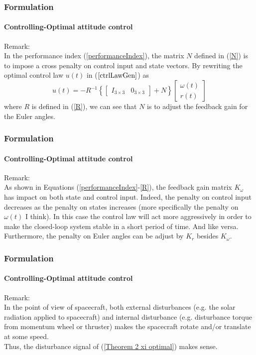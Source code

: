 \documentclass{beamer}
\begin{document}
\begin{frame}
\frametitle{Formulation}
\framesubtitle{Controlling-Optimal attitude control}
Remark:\\
In the performance index (\ref{performanceIndex}), the matrix $N$ defined in (\ref{N}) is to impose a cross penalty on control input and state vectors. 
By rewriting the optimal control law $u(t)$ in ($\ref{ctrlLawGen}$) as
\begin{equation}
u(t)=-R^{-1}\left\{\begin{bmatrix}
I_{3\times 3}&0_{3\times 3}
\end{bmatrix}+N\right\}\begin{bmatrix}
\omega(t)\\r(t)
\end{bmatrix}
\end{equation}
where $R$ is defined in (\ref{R}), we can see that $N$ is to adjust the feedback gain for the Euler angles.
\end{frame}

\begin{frame}
\frametitle{Formulation}
\framesubtitle{Controlling-Optimal attitude control}
Remark:\\
As shown in Equations (\ref{performanceIndex}-\ref{R}), the feedback gain matrix $K_{\omega}$ has impact on both state and control input. 
Indeed, the penalty on control input decreases as the penalty on states increases (more specifically the penalty on $\omega(t)$ I think). In this case the control law will act more aggressively in order to make the closed-loop system stable in a short period of time. And like versa.\\
Furthermore, the penalty on Euler angles can be adjust by $K_{r}$ besides $K_{\omega}$.
\end{frame}

\begin{frame}
\frametitle{Formulation}
\framesubtitle{Controlling-Optimal attitude control}
Remark:\\
In the point of view of spacecraft, both external disturbances (e.g. the solar radiation applied to spacecraft) and internal disturbance (e.g. disturbance torque from momentum wheel or thruster) makes the spacecraft rotate and/or translate at some speed. \\
Thus, the disturbance signal of (\ref{Theorem 2 xi optimal}) makes sense. \\
\end{frame}
\end{document}
